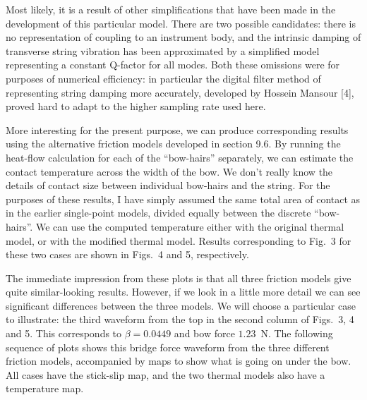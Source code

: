   Most likely, it is a result of other simplifications that have been made in 
  the development of this particular model. There are two possible candidates: 
  there is no representation of coupling to an instrument body, and the 
  intrinsic damping of transverse string vibration has been approximated by a 
  simplified model representing a constant Q-factor for all modes. Both these 
  omissions were for purposes of numerical efficiency: in particular the 
  digital filter method of representing string damping more accurately, 
  developed by Hossein Mansour [4], proved hard to adapt to the higher sampling 
  rate used here. 

  More interesting for the present purpose, we can produce corresponding 
  results using the alternative friction models developed in section 9.6. By 
  running the heat-flow calculation for each of the ``bow-hairs'' separately, 
  we can estimate the contact temperature across the width of the bow. We don't 
  really know the details of contact size between individual bow-hairs and the 
  string. For the purposes of these results, I have simply assumed the same 
  total area of contact as in the earlier single-point models, divided equally 
  between the discrete ``bow-hairs''. We can use the computed temperature 
  either with the original thermal model, or with the modified thermal model. 
  Results corresponding to Fig.\ 3 for these two cases are shown in Figs.\ 4 
  and 5, respectively. 



  The immediate impression from these plots is that all three friction models 
  give quite similar-looking results. However, if we look in a little more 
  detail we can see significant differences between the three models. We will 
  choose a particular case to illustrate: the third waveform from the top in 
  the second column of Figs.\ 3, 4 and 5. This corresponds to $\beta=0.0449$ 
  and bow force $1.23$~N. The following sequence of plots shows this bridge 
  force waveform from the three different friction models, accompanied by maps 
  to show what is going on under the bow. All cases have the stick-slip map, 
  and the two thermal models also have a temperature map. 

